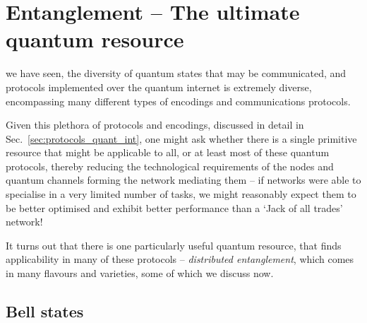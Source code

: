 %
%

\section{Entanglement -- The ultimate quantum resource} \label{sec:ent_ultimate} 

 we have seen, the diversity of quantum states that may be communicated, and protocols implemented over the quantum internet is extremely diverse, encompassing many different types of encodings and communications protocols.

Given this plethora of protocols and encodings, discussed in detail in Sec.~\ref{sec:protocols_quant_int}, one might ask whether there is a single primitive resource that might be applicable to all, or at least most of these quantum protocols, thereby reducing the technological requirements of the nodes and quantum channels forming the network mediating them -- if networks were able to specialise in a very limited number of tasks, we might reasonably expect them to be better optimised and exhibit better performance than a `Jack of all trades' network!

It turns out that there is one particularly useful quantum resource, that finds applicability in many of these protocols -- \textit{distributed entanglement}, which comes in many flavours and varieties, some of which we discuss now.

%
%

\subsection{Bell states}

